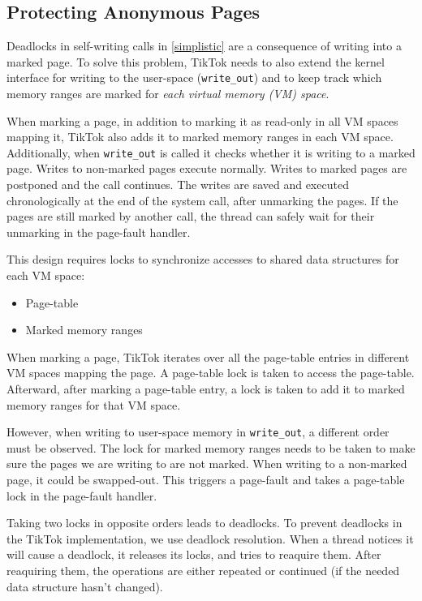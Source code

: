 \documentclass[conference]{IEEEtran}
\newcommand{\sysname}{TikTok}
\begin{document}
\subsection{Protecting Anonymous Pages}
\label{subsec:complex}

Deadlocks in self-writing calls in \autoref{simplistic} are a consequence of
writing into a marked page. To solve this problem, \sysname{} needs to also extend
the kernel interface for writing to the user-space (\texttt{write\_out}) and to
keep track which memory ranges are marked for \emph{each virtual memory (VM) space}.

When marking a page, in addition to marking it as read-only in all VM spaces
mapping it, \sysname{} also adds it to marked memory ranges in each VM space.
Additionally, when \texttt{write\_out} is called it checks whether it is writing
to a marked page. Writes to non-marked pages execute normally. Writes to marked
pages are postponed and the call continues. The writes are saved and executed
chronologically at the end of the system call, after unmarking the pages. If the
pages are still marked by another call, the thread can safely wait for their
unmarking in the page-fault handler.

This design requires locks to synchronize accesses to shared data structures for each VM space:
\begin{itemize}
  \item Page-table
  \item Marked memory ranges
\end{itemize}

When marking a page, \sysname{} iterates over all the page-table entries in different
VM spaces mapping the page. A page-table lock is taken to access the page-table.
Afterward, after marking a page-table entry, a lock is taken to add it
to marked memory ranges for that VM space.

However, when writing to user-space memory in \texttt{write\_out}, a different 
order must be observed. The lock for marked memory ranges needs to be taken to
make sure the pages we are writing to are not marked. When writing to a non-marked
page, it could be swapped-out. This triggers a page-fault and takes a page-table lock
in the page-fault handler.

Taking two locks in opposite orders leads to deadlocks. To prevent deadlocks
in the \sysname{} implementation, we use deadlock resolution. When a thread notices
it will cause a deadlock, it releases its locks, and tries to reaquire them.
After reaquiring them, the operations are either repeated or continued (if the
needed data structure hasn't changed).
\end{document}
